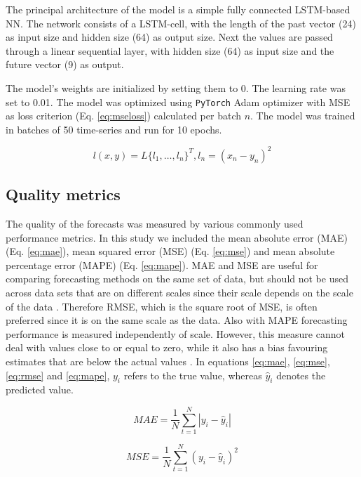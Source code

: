 \documentclass[format=sigconf, review=false, screen=true]{acmart}
\begin{document}
The principal architecture of the model is a simple fully connected LSTM-based NN. The network consists of a LSTM-cell, with the length of the past vector (24) as input size and hidden size (64) as output size. Next the values are passed through a linear sequential layer, with hidden size (64) as input size and the future vector (9) as output. 

The model's weights are initialized by setting them to 0. The learning rate was set to 0.01. The model was optimized using \texttt{PyTorch} Adam optimizer \citep{paszke2017automatic} with MSE as loss criterion (Eq. \ref{eq:mseloss}) calculated per batch $n$. The model was trained in batches of 50 time-series and run for 10 epochs.  

\begin{equation}
\label{eq:mseloss}
	l(x, y) = L \{l_1, \dots, l_n\}^T, l_n = (x_n - y_n)^2
\end{equation}  

 
\subsection{Quality metrics}

The quality of the forecasts was measured by various commonly used performance metrics. In this study we included the mean absolute error (MAE) (Eq. \ref{eq:mae}), mean squared error (MSE) (Eq. \ref{eq:mse}) and mean absolute percentage error (MAPE) (Eq. \ref{eq:mape}). MAE and MSE are useful for comparing forecasting methods on the same set of data, but should not be used across data sets that are on different scales since their scale depends on the scale of the data \citep{chen2017new}. Therefore RMSE, which is the square root of MSE, is often preferred since it is on the same scale as the data. Also with MAPE forecasting performance is measured independently of scale. However, this measure cannot deal with values close to or equal to zero, while it also has a bias favouring estimates that are below the actual values \citep{chen2017new}. In equations \ref{eq:mae}, \ref{eq:mse}, \ref{eq:rmse} and \ref{eq:mape}, $y_i$ refers to the true value, whereas $\hat{y}_i$ denotes the predicted value.    



\begin{equation}
\label{eq:mae}
	MAE = \frac{1}{N} \sum_{t=1}^{N} |y_i-\hat{y}_i|
\end{equation}

\begin{equation}
\label{eq:mse}
	MSE = \frac{1}{N} \sum_{t=1}^{N} (y_i-\hat{y}_i)^2
\end{equation}
\end{document}
